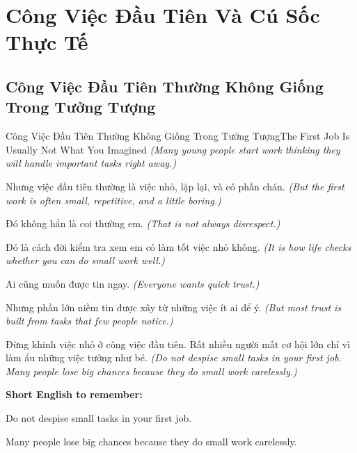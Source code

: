 \chapter{Công Việc Đầu Tiên Và Cú Sốc Thực Tế}

\section{Công Việc Đầu Tiên Thường Không Giống Trong Tưởng Tượng}
\begin{truyen}{Công Việc Đầu Tiên Thường Không Giống Trong Tưởng Tượng}{The First Job Is Usually Not What You Imagined}
\textit{(Many young people start work thinking they will handle important tasks right away.)}

Nhưng việc đầu tiên thường là việc nhỏ, lặp lại, và có phần chán.
\textit{(But the first work is often small, repetitive, and a little boring.)}

Đó không hẳn là coi thường em.
\textit{(That is not always disrespect.)}

Đó là cách đời kiểm tra xem em có làm tốt việc nhỏ không.
\textit{(It is how life checks whether you can do small work well.)}

Ai cũng muốn được tin ngay.
\textit{(Everyone wants quick trust.)}

Nhưng phần lớn niềm tin được xây từ những việc ít ai để ý.
\textit{(But most trust is built from tasks that few people notice.)}

\end{truyen}

\begin{baihoc}
Đừng khinh việc nhỏ ở công việc đầu tiên. Rất nhiều người mất cơ hội lớn chỉ vì làm ẩu những việc tưởng như bé.
\textit{(Do not despise small tasks in your first job. Many people lose big chances because they do small work carelessly.)}
\end{baihoc}

\begin{ghinhoanh}
\textbf{Short English to remember:}

Do not despise small tasks in your first job.

Many people lose big chances because they do small work carelessly.

\end{ghinhoanh}

